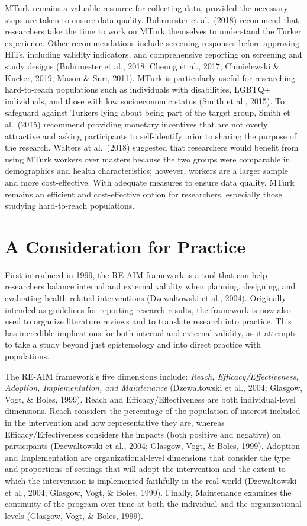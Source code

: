 \documentclass[
  11pt,
]{book}
\begin{document}
MTurk remains a valuable resource for collecting data, provided the necessary steps are taken to ensure data quality. Buhrmester et al.~(2018) recommend that researchers take the time to work on MTurk themselves to understand the Turker experience. Other recommendations include screening responses before approving HITs, including validity indicators, and comprehensive reporting on screening and study designs (Buhrmester et al., 2018; Cheung et al., 2017; Chmielewski \& Kucker, 2019; Mason \& Suri, 2011). MTurk is particularly useful for researching hard-to-reach populations such as individuals with disabilities, LGBTQ+ individuals, and those with low socioeconomic status (Smith et al., 2015). To safeguard against Turkers lying about being part of the target group, Smith et al.~(2015) recommend providing monetary incentives that are not overly attractive and asking participants to self-identify prior to sharing the purpose of the research. Walters at al.~(2018) suggested that researchers would benefit from using MTurk workers over masters because the two groups were comparable in demographics and health characteristics; however, workers are a larger sample and more cost-effective. With adequate measures to ensure data quality, MTurk remains an efficient and cost-effective option for researchers, especially those studying hard-to-reach populations.

\section{A Consideration for Practice}\label{a-consideration-for-practice}

First introduced in 1999, the RE-AIM framework is a tool that can help researchers balance internal and external validity when planning, designing, and evaluating health-related interventions (Dzewaltowski et al., 2004). Originally intended as guidelines for reporting research results, the framework is now also used to organize literature reviews and to translate research into practice. This has incredible implications for both internal and external validity, as it attempts to take a study beyond just epistemology and into direct practice with populations.

The RE-AIM framework's five dimensions include: \emph{Reach, Efficacy/Effectiveness, Adoption, Implementation, and Maintenance} (Dzewaltowski et al., 2004; Glasgow, Vogt, \& Boles, 1999). Reach and Efficacy/Effectiveness are both individual-level dimensions. Reach considers the percentage of the population of interest included in the intervention and how representative they are, whereas Efficacy/Effectiveness considers the impacts (both positive and negative) on participants (Dzewaltowski et al., 2004; Glasgow, Vogt, \& Boles, 1999). Adoption and Implementation are organizational-level dimensions that consider the type and proportions of settings that will adopt the intervention and the extent to which the intervention is implemented faithfully in the real world (Dzewaltowski et al., 2004; Glasgow, Vogt, \& Boles, 1999). Finally, Maintenance examines the continuity of the program over time at both the individual and the organizational levels (Glasgow, Vogt, \& Boles, 1999).
\end{document}
